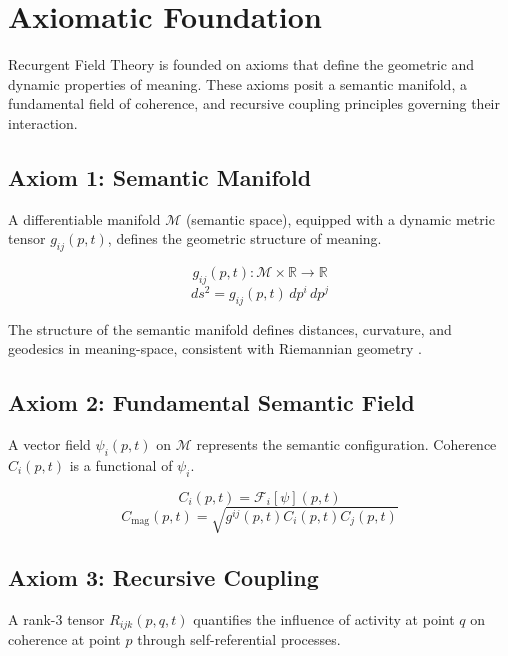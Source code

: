\chapter{Axiomatic Foundation}

Recurgent Field Theory is founded on axioms that define the geometric and dynamic properties of meaning. These axioms posit a semantic manifold, a fundamental field of coherence, and recursive coupling principles governing their interaction.

\section{Axiom 1: Semantic Manifold}

A differentiable manifold \(\mathcal{M}\) (semantic space), equipped with a dynamic metric tensor \(g_{ij}(p,t)\), defines the geometric structure of meaning.

\begin{equation}
g_{ij}(p,t) : \mathcal{M} \times \mathbb{R} \rightarrow \mathbb{R}
\end{equation}
\begin{equation}
ds^2 = g_{ij}(p,t) \, dp^i \, dp^j
\end{equation}

The structure of the semantic manifold defines distances, curvature, and geodesics in meaning-space, consistent with Riemannian geometry \autocite{Riemann1868}.

\section{Axiom 2: Fundamental Semantic Field}

A vector field \(\psi_i(p,t)\) on \(\mathcal{M}\) represents the semantic configuration. Coherence \(C_i(p,t)\) is a functional of \(\psi_i\).

\begin{equation}
C_i(p,t) = \mathcal{F}_i[\psi](p,t)
\end{equation}
\begin{equation}
C_{\text{mag}}(p,t) = \sqrt{g^{ij}(p,t) C_i(p,t) C_j(p,t)}
\end{equation}

\section{Axiom 3: Recursive Coupling}

A rank-3 tensor \(R_{ijk}(p,q,t)\) quantifies the influence of activity at point \(q\) on coherence at point \(p\) through self-referential processes.

